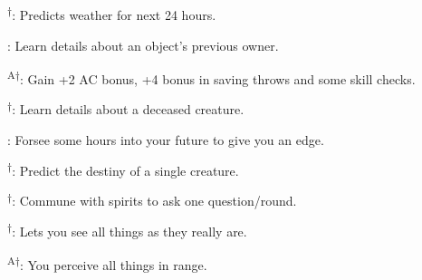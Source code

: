 \begin{enumerate*}
      \textsuperscript{$\dagger$}: Predicts weather for next 24 hours.

\item {}: Learn details about an object's previous owner.

      \textsuperscript{A$\dagger$}: Gain +2 AC bonus, +4 bonus in saving throws and some skill checks.

\item {}\textsuperscript{$\dagger$}: Learn details about a deceased creature.

      : Forsee some hours into your future to give you an edge.

\item {}\textsuperscript{$\dagger$}: Predict the destiny of a single creature.

\item {}\textsuperscript{$\dagger$}: Commune with spirits to ask one question/round.

      \textsuperscript{$\dagger$}: Lets you see all things as they really are.

\item {}\textsuperscript{A$\dagger$}: You perceive all things in range.
\end{enumerate*}



